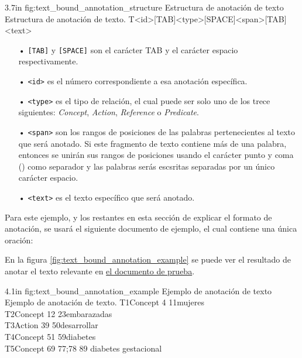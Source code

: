 \begin{annexample}
	[backgroundcolor=green!13]
	{3.7in}
	{fig:text_bound_annotation_structure}
	{Estructura de anotación de texto}
	{Estructura de anotación de texto.}
	T<id>[TAB]<type>[SPACE]<span>[TAB]<text>
\end{annexample}

\begin{itemize}
	\item[•] \texttt{[TAB]} y \texttt{[SPACE]} son el carácter TAB y el carácter espacio respectivamente.
	\vspace{-0.1in}
	\item[•] \texttt{<id>} es el número correspondiente a esa anotación específica.
	\vspace{-0.1in}
	\item[•] \texttt{<type>} es el tipo de relación, el cual puede ser solo uno de los trece siguientes: {\it Concept}, {\it Action}, {\it Reference} o {\it Predicate}.
	\vspace{-0.1in}
	\item[•] \texttt{<span>} son los rangos de posiciones de las palabras pertenecientes al texto que será anotado. Si este fragmento de texto contiene más de una palabra, entonces se unirán sus rangos de posiciones usando el carácter punto y coma (\doublequote{\texttt{;}}) como separador y las palabras serás escsritas separadas por un único carácter espacio.
	\vspace{-0.1in}
	\item[•] \texttt{<text>} es el texto específico que será anotado.
\end{itemize}

Para este ejemplo, y los restantes en esta sección de explicar el formato de anotación, se usará el siguiente documento de ejemplo, el cual contiene una única oración:
\begin{center}
	\label{sentence:annotation_example}
\end{center}

En la figura \ref{fig:text_bound_annotation_example} se puede ver el resultado de anotar el texto relevante en \hyperref[sentence:annotation_example]{el documento de prueba}.

\begin{annexample}
	[backgroundcolor=cyan!13]
	{4.1in}
	{fig:text_bound_annotation_example}
	{Ejemplo de anotación de texto}
	{Ejemplo de anotación de texto.}
	T1\space\space Concept 4 11\space\space\space\space mujeres\\
	T2\space\space Concept 12 23\space\space\space embarazadas\\
	T3\space\space Action 39 50\space\space\space\space desarrollar\\
	T4\space\space Concept 51 59\space\space\space diabetes\\
	T5\space\space Concept 69 77;78 89 diabetes gestacional
\end{annexample}

